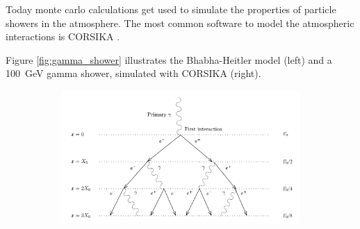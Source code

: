 Today monte carlo calculations get used to simulate the properties 
of particle showers in the atmosphere.
The most common software to model the atmospheric interactions is
CORSIKA \cite{Engel:2018akg}.

Figure \ref{fig:gamma_shower} illustrates the Bhabha-Heitler model (left)
and a \SI{100}{\giga\electronvolt} gamma shower, simulated with CORSIKA (right).

\begin{figure}
	\centering
	\captionsetup{width=0.9\linewidth}
	\begin{subfigure}{.7\textwidth}
  		\centering
  		\includegraphics[width=\linewidth]{images/em_shower_illustration.png}
	\end{subfigure}%
	\begin{subfigure}{.2\textwidth}
 		\centering

\end{subfigure}
\end{figure}
